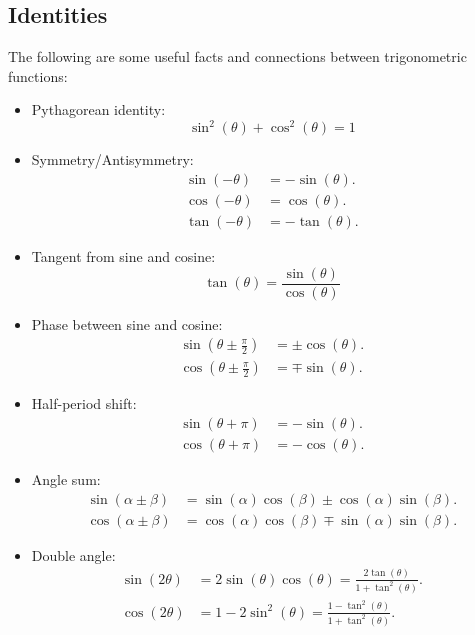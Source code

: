 \subsection{Identities}
The following are some useful facts and connections between trigonometric functions:
\begin{itemize}
	\item Pythagorean identity:
		\begin{equation}
			\sin^{2}(\theta) + \cos^{2}(\theta) = 1
		\end{equation}
	
	\item Symmetry/Antisymmetry:
		\begin{align}
			\sin(-\theta) &= -\sin(\theta).\\
			\cos(-\theta) &= \cos(\theta).\\
			\tan(-\theta) &= -\tan(\theta).
		\end{align}
	
	\item Tangent from sine and cosine:
		\begin{equation}
			\tan(\theta)=\frac{\sin(\theta)}{\cos(\theta)}
		\end{equation}
	
	\item Phase between sine and cosine:
		\begin{align}
			\sin\left(\theta\pm\frac{\pi}{2}\right) &= \pm\cos(\theta).\\
			\cos\left(\theta\pm\frac{\pi}{2}\right) &= \mp\sin(\theta).
		\end{align}
	
	\item Half-period shift:
		\begin{align}
			\sin(\theta+\pi) &= -\sin(\theta).\\
			\cos(\theta+\pi) &= -\cos(\theta).
		\end{align}
	
	\item Angle sum:
		\begin{align}
			\sin(\alpha\pm\beta) &= \sin(\alpha)\cos(\beta)\pm\cos(\alpha)\sin(\beta).\\
			\cos(\alpha\pm\beta) &= \cos(\alpha)\cos(\beta)\mp\sin(\alpha)\sin(\beta).
		\end{align}
	
	\item Double angle:
		\begin{align}
			\sin(2\theta) &= 2\sin(\theta)\cos(\theta) = \frac{2\tan \left( \theta \right)}{1+\tan^{2} \left( \theta \right)}.\nonumber\\
			\cos(2\theta) &= 1-2\sin^{2}(\theta) = \frac{1-\tan^{2} \left( \theta \right) }{1+\tan^{2} \left( \theta \right)}.\\
			\label{eq:tan_double_angles}
		\end{align}
	

\end{itemize}
